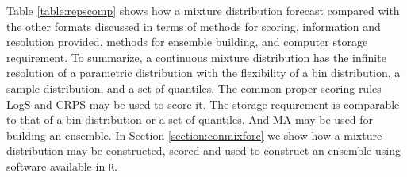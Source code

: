 \documentclass[11pt,notitlepage]{isuthesis}
\begin{document}
Table \ref{table:repscomp} shows how a mixture distribution forecast 
compared with the other formats discussed in terms of methods for scoring,
information and resolution provided, methods for ensemble building, and computer
storage requirement. To summarize, a continuous mixture distribution has the 
infinite resolution of a parametric distribution with the flexibility of a bin
distribution, a sample distribution, and a set of quantiles. The common proper
scoring rules LogS and CRPS may be used to score it. The storage requirement is
comparable to that of a bin distribution or a set of quantiles. And MA may be 
used for building an ensemble.
In Section
\ref{section:conmixforc} we show how a mixture distribution may be constructed,
scored and used to construct an ensemble using software available in 
\texttt{R}.
\end{document}
